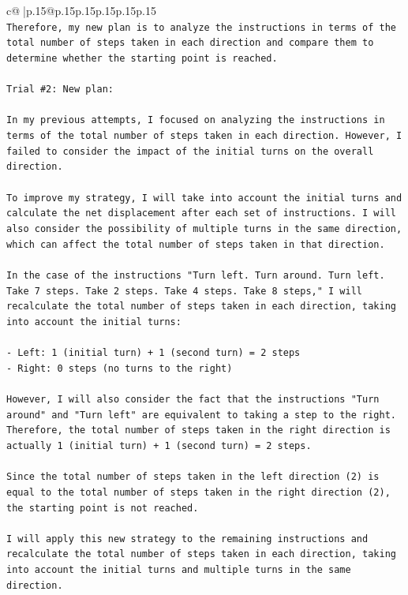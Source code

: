\documentclass{article}
\begin{document}
{\begin{supertabular}{c@{$\;$}|p{.15\linewidth}@{}p{.15\linewidth}p{.15\linewidth}p{.15\linewidth}p{.15\linewidth}p{.15\linewidth}}
{{{\\ 
\texttt{Therefore, my new plan is to analyze the instructions in terms of the total number of steps taken in each direction and compare them to determine whether the starting point is reached.} \\
\\ 
\texttt{Trial \#2: New plan: } \\
\\ 
\texttt{In my previous attempts, I focused on analyzing the instructions in terms of the total number of steps taken in each direction. However, I failed to consider the impact of the initial turns on the overall direction. } \\
\\ 
\texttt{To improve my strategy, I will take into account the initial turns and calculate the net displacement after each set of instructions. I will also consider the possibility of multiple turns in the same direction, which can affect the total number of steps taken in that direction.} \\
\\ 
\texttt{In the case of the instructions "Turn left. Turn around. Turn left. Take 7 steps. Take 2 steps. Take 4 steps. Take 8 steps," I will recalculate the total number of steps taken in each direction, taking into account the initial turns:} \\
\\ 
\texttt{{-} Left: 1 (initial turn) + 1 (second turn) = 2 steps} \\
\texttt{{-} Right: 0 steps (no turns to the right)} \\
\\ 
\texttt{However, I will also consider the fact that the instructions "Turn around" and "Turn left" are equivalent to taking a step to the right. Therefore, the total number of steps taken in the right direction is actually 1 (initial turn) + 1 (second turn) = 2 steps.} \\
\\ 
\texttt{Since the total number of steps taken in the left direction (2) is equal to the total number of steps taken in the right direction (2), the starting point is not reached.} \\
\\ 
\texttt{I will apply this new strategy to the remaining instructions and recalculate the total number of steps taken in each direction, taking into account the initial turns and multiple turns in the same direction.} \\
\\ 
}}}
\end{supertabular}}
\end{document}
